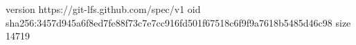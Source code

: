 version https://git-lfs.github.com/spec/v1
oid sha256:3457d945a6f8ed7fe88f73c7e7cc916fd501f67518c6f9f9a7618b5485d46c98
size 14719
